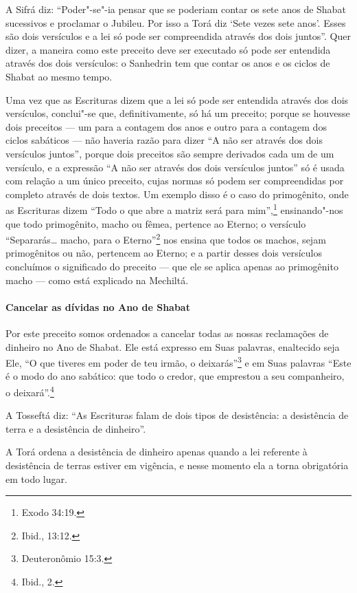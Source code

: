 \begin{multicols}{2}
A Sifrá\starr{} diz: ``Poder"-se"-ia pensar que se poderiam contar os sete anos de
Shabat sucessivos e proclamar o Jubileu. Por isso a Torá\starr{} diz `Sete
vezes sete anos'. Esses são dois versículos e a lei só pode ser
compreendida através dos dois juntos''. Quer dizer, a maneira como este
preceito deve ser executado só pode ser entendida através dos dois
versículos: o Sanhedrin\starr{} tem que contar os anos e os ciclos de Shabat ao
mesmo tempo.

Uma vez que as Escrituras dizem que a lei só pode ser entendida através
dos dois versículos, conclui"-se que, definitivamente, só há um preceito;
porque se houvesse dois preceitos --- um para a contagem dos anos e
outro para a contagem dos ciclos sabáticos --- não haveria razão para
dizer ``A não ser através dos dois versículos juntos'', porque dois
preceitos são sempre derivados cada um de um versículo, e a expressão
``A não ser através dos dois versículos juntos'' só é usada com relação
a um único preceito, cujas normas só podem
ser compreendidas por completo através de dois textos. Um exemplo disso
é o caso do primogênito, onde as Escrituras dizem ``Todo o que abre a
matriz será para mim'',\footnote{Exodo 34:19.} ensinando"-nos que todo
primogênito, macho ou fêmea, pertence ao Eterno; o versículo
``Separarás\ldots{} macho, para o Eterno''\footnote{Ibid., 13:12.} nos ensina que
todos os machos, sejam primogênitos ou não, pertencem ao Eterno; e a
partir desses dois versículos concluímos o significado do preceito ---
que ele se aplica apenas ao primogênito macho --- como está explicado na
Mechiltá\starr.

\paragraph{Cancelar as dívidas no Ano de Shabat}

Por este preceito somos ordenados a cancelar todas as nossas
reclamações de dinheiro no Ano de Shabat. Ele está expresso em Suas
palavras, enaltecido seja Ele, ``O que tiveres em poder de teu irmão, o
deixarás''\footnote{Deuteronômio 15:3.} e em Suas palavras ``Este é o modo do
ano sabático: que todo o credor, que emprestou a seu companheiro, o
deixará''.\footnote{Ibid., 2.}

A Tosseftá\starr{} diz: ``As Escrituras falam de dois tipos de desistência: a
desistência de terra e a desistência de dinheiro''.

A Torá\starr{} ordena a desistência de dinheiro apenas quando a lei referente
à desistência de terras estiver em vigência, e nesse momento ela a torna
obrigatória em todo lugar.


\end{multicols}
